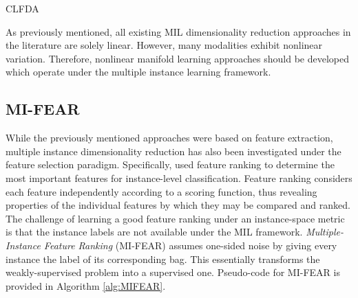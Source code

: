 \begin{algorithm}[h!]
	\caption{CLFDA}
	\label{alg:CLFDA}
	\begin{algorithmic}[1]
		\Else
		\EndIf
		\EndFor             
	\end{algorithmic}
\end{algorithm}

As previously mentioned, all existing MIL dimensionality reduction approaches in the literature are solely linear.  However, many modalities exhibit nonlinear variation.  Therefore, nonlinear manifold learning approaches should be developed which operate under the multiple instance learning framework. 

\subsection{MI-FEAR} \label{sec:MIFEAR}
While the previously mentioned approaches were based on feature extraction,  multiple instance dimensionality reduction has also been investigated under the feature selection paradigm.  Specifically, \cite{Latham2015MIFeatureRankingThesis} used feature ranking to determine the most important features for instance-level classification.  Feature ranking considers each feature independently according to a scoring function, thus revealing properties of the individual features by which they may be compared and ranked.  The challenge of learning a good feature ranking under an instance-space metric is that the instance labels are not available under the MIL framework.  \textit{Multiple-Instance Feature Ranking} (MI-FEAR) \citep{Latham2015MIFeatureRankingThesis} assumes one-sided noise by giving every instance the label of its corresponding bag.  This essentially transforms the weakly-supervised problem into a supervised one.  Pseudo-code for MI-FEAR is provided in Algorithm \ref{alg:MIFEAR}.

